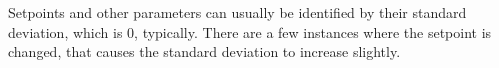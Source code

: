 Setpoints and other parameters can usually be identified by their standard deviation, which is 0, typically.  There are a few instances where 
the setpoint is changed, that causes the standard deviation to increase slightly.

%
%
